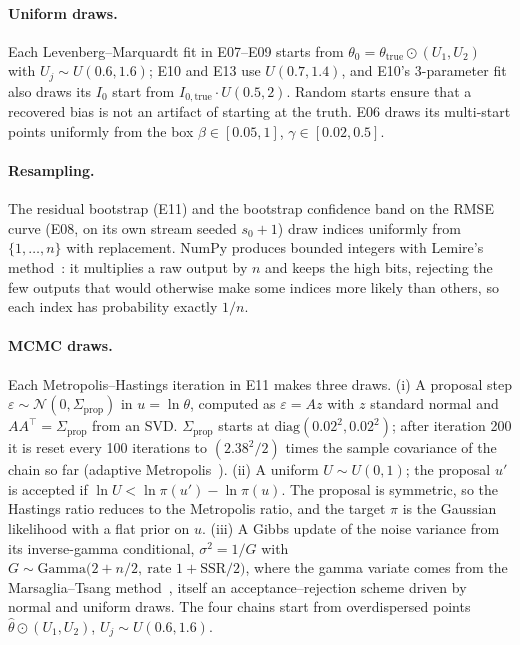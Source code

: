 \paragraph{Uniform draws.} Each Levenberg--Marquardt fit in E07--E09 starts from
$\theta_0 = \theta_{\mathrm{true}} \odot (U_1, U_2)$ with $U_j \sim U(0.6, 1.6)$; E10 and E13 use
$U(0.7, 1.4)$, and E10's 3-parameter fit also draws its $I_0$ start from
$I_{0,\mathrm{true}} \cdot U(0.5, 2)$. Random starts ensure that a recovered bias is not an
artifact of starting at the truth. E06 draws its multi-start points uniformly from the box
$\beta \in [0.05, 1]$, $\gamma \in [0.02, 0.5]$.

\paragraph{Resampling.} The residual bootstrap (E11) and the bootstrap confidence band on the RMSE
curve (E08, on its own stream seeded $s_0+1$) draw indices uniformly from $\{1, \dots, n\}$ with
replacement. NumPy produces bounded integers with Lemire's method~\cite{lemire2019}: it multiplies
a raw output by $n$ and keeps the high bits, rejecting the few outputs that would otherwise make
some indices more likely than others, so each index has probability exactly $1/n$.

\paragraph{MCMC draws.} Each Metropolis--Hastings iteration in E11 makes three draws.
(i) A proposal step $\varepsilon \sim \mathcal{N}(0, \Sigma_{\mathrm{prop}})$ in $u = \ln\theta$,
computed as $\varepsilon = A z$ with $z$ standard normal and $AA^\top = \Sigma_{\mathrm{prop}}$
from an SVD. $\Sigma_{\mathrm{prop}}$ starts at $\mathrm{diag}(0.02^2, 0.02^2)$; after iteration
200 it is reset every 100 iterations to $(2.38^2/2)$ times the sample covariance of the chain so
far (adaptive Metropolis~\cite{haario2001}). (ii) A uniform $U \sim U(0,1)$; the proposal $u'$ is
accepted if $\ln U < \ln \pi(u') - \ln \pi(u)$. The proposal is symmetric, so the Hastings ratio
reduces to the Metropolis ratio, and the target $\pi$ is the Gaussian likelihood with a flat prior
on $u$. (iii) A Gibbs update of the noise variance from its inverse-gamma conditional,
$\sigma^2 = 1/G$ with $G \sim \mathrm{Gamma}\big(2 + n/2,\ \text{rate } 1 + \mathrm{SSR}/2\big)$,
where the gamma variate comes from the Marsaglia--Tsang method~\cite{marsaglia2000gamma}, itself
an acceptance--rejection scheme driven by normal and uniform draws. The four chains start from
overdispersed points $\hat\theta \odot (U_1, U_2)$, $U_j \sim U(0.6, 1.6)$.

